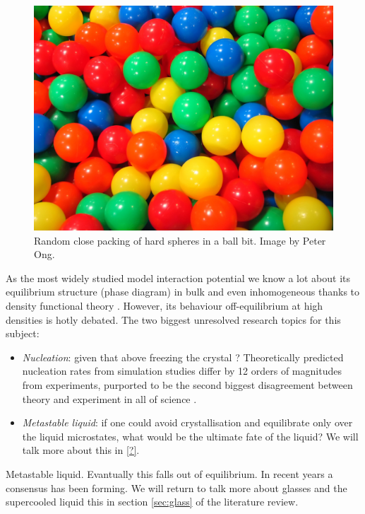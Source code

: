 \documentclass[11pt,twoside]{report}
\begin{document}
\begin{figure}
  \includegraphics[width=0.75\linewidth,outer]{ball-pit-horizontal}
  \caption[Random close packing in a ball pit]{
    Random close packing of hard spheres in a ball bit.
    Image by Peter Ong.}
  \label{fig:rcp}
\end{figure}

As the most widely studied model interaction potential we know a lot about its equilibrium structure (phase diagram) in bulk and even inhomogeneous thanks to density functional theory \cite{?,?,?}.
However, its behaviour off-equilibrium at high densities is hotly debated.
The two biggest unresolved research topics for this subject:
\begin{itemize}
\item \emph{Nucleation}: given that above freezing the crystal ? Theoretically predicted nucleation rates from simulation studies differ by 12 orders of magnitudes from experiments, purported to be the second biggest disagreement between theory and experiment in all of science \cite{?}.
\item \emph{Metastable liquid}: if one could avoid crystallisation and equilibrate only over the liquid microstates, what would be the ultimate fate of the liquid?
  We will talk more about this in \ref{?}.
\end{itemize}

Metastable liquid.
Evantually this falls out of equilibrium.
In recent years a consensus has been forming.
We will return to talk more about glasses and the supercooled liquid this in section \ref{sec:glass} of the literature review.
\end{document}
